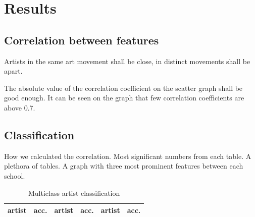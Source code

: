 \documentclass[11pt,a4paper,twoside,openright,draft]{report}
\begin{document}
\chapter{Results}
\label{chap:results}
\begin{multicols}{2}





\section{Correlation between features}

Artists in the same art movement shall be close, in distinct movements shall be
apart.

The absolute value of the correlation coefficient on the scatter graph shall be
good enough.  It can be seen on the graph that few correlation coefficients are
above 0.7.

\section{Classification}

How we calculated the correlation.  Most significant numbers from each table.
A plethora of tables.  A graph with three most prominent features between each
school.

%
%
%
%
%
%

\begin{table}[ptb]
\centering
{}
\begin{tabular}{|l|r||l|r||l|r|}
\toprule
artist & acc. & artist & acc. & artist & acc. \\
\midrule

\bottomrule
\end{tabular}
\caption[Multiclass artist classification]{Multiclass artist classification}
\label{tab:predart}
\end{table}


\end{multicols}
\end{document}
